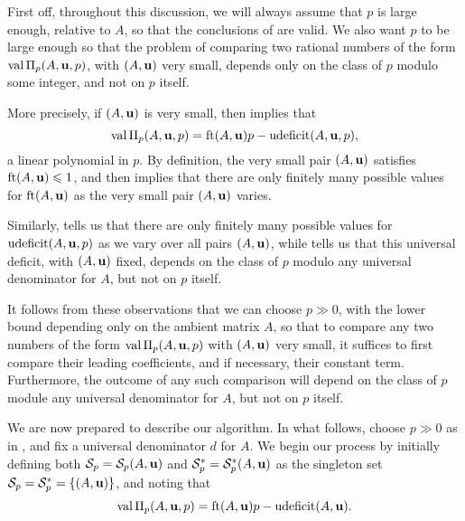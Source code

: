 \documentclass[11pt]{amsart}
\newcommand{\udeficit}{\operatorname{udeficit}}
\newcommand{\denom}{d}
\renewcommand{\S}{\mathcal{S}}
\begin{document}
\begin{remark}
   \label{p large m-primary: R}
   First off, throughout this discussion, we will always assume that $p$ is large enough, relative to $A$, so that the conclusions of  are valid.
   We also want $p$ to be large enough so that the problem of comparing two rational numbers of the form $\operatorname{val} \Pi_p(A,\mathbf{u},p)$, with $(A,\mathbf{u})$ very small, depends only on the class of $p$ modulo some integer, and not on $p$ itself.

   More precisely, if $(A,\mathbf{u})$ is very small, then   implies that
   \[ \val \IP_p(A,\vv{u},p) = \ft{A}{\vv{u}}p-\udeficit(A,\vv{u},p), \]
   a linear polynomial in $p$.
   By definition, the very small pair $(A,\mathbf{u})$ satisfies $\operatorname{ft}(A, \mathbf{u}) \leqslant 1$, and  then implies that there are only finitely many possible values for $\operatorname{ft}(A, \mathbf{u})$ as the very small pair $(A,\mathbf{u})$ varies.

   Similarly,  tells us that there are only finitely many possible values for $\udeficit(A,\vv{u},p)$ as we vary over all pairs $(A,\mathbf{u})$, while  tells us that this universal deficit, with $(A,\mathbf{u})$ fixed, depends on the class of $p$ modulo any universal denominator for $A$, but not on $p$ itself.

   It follows from these observations that we can choose $p \gg 0$, with the lower bound depending only on the ambient matrix $A$, so that to compare any two numbers of the form $\operatorname{val} \Pi_p(A,\mathbf{u},p)$ with $(A,\mathbf{u})$ very small, it suffices to first compare their leading coefficients, and if necessary, their constant term.
   Furthermore, the outcome of any such comparison will depend on the class of $p$ module any universal denominator for $A$, but not on $p$ itself.
\end{remark}


We are now prepared to describe our algorithm.
In what follows, choose $p \gg 0$ as in , and fix a universal denominator  $\denom$ for $A$.
We begin our process by initially defining both $\S_p = \S_p(A,\vv{u})$ and $\S^{\ast}_p = \S^{\ast}_p(A,\vv{u})$ as the singleton set $\S_p=\S_p^{\ast} = \{ (A,\vv{u}) \}$,  and noting that 
\[ \val \IP_p(A,\vv{u},p) = \ft{A}{\vv{u}}p-\udeficit(A,\vv{u}).\]
\end{document}
